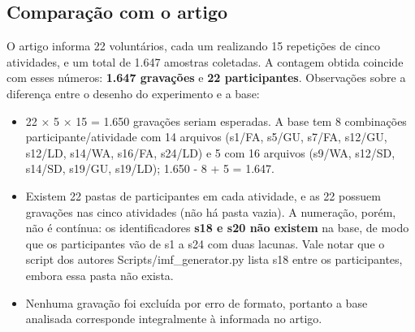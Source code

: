 \subsection{Comparação com o artigo}

O artigo informa 22 voluntários, cada um realizando 15 repetições de cinco atividades, e um total de 1.647 amostras coletadas. A contagem obtida coincide com esses números: \textbf{1.647 gravações} e \textbf{22 participantes}. Observações sobre a diferença entre o desenho do experimento e a base:

\begin{itemize}
    \item 22 × 5 × 15 = 1.650 gravações seriam esperadas. A base tem 8 combinações participante/atividade com 14 arquivos (s1/FA, s5/GU, s7/FA, s12/GU, s12/LD, s14/WA, s16/FA, s24/LD) e 5 com 16 arquivos (s9/WA, s12/SD, s14/SD, s19/GU, s19/LD); 1.650 - 8 + 5 = 1.647.
    \item Existem 22 pastas de participantes em cada atividade, e as 22 possuem gravações nas cinco atividades (não há pasta vazia). A numeração, porém, não é contínua: os identificadores \textbf{s18 e s20 não existem} na base, de modo que os participantes vão de s1 a s24 com duas lacunas. Vale notar que o script dos autores Scripts/imf\_generator.py lista s18 entre os participantes, embora essa pasta não exista.
    \item Nenhuma gravação foi excluída por erro de formato, portanto a base analisada corresponde integralmente à informada no artigo.
\end{itemize}
